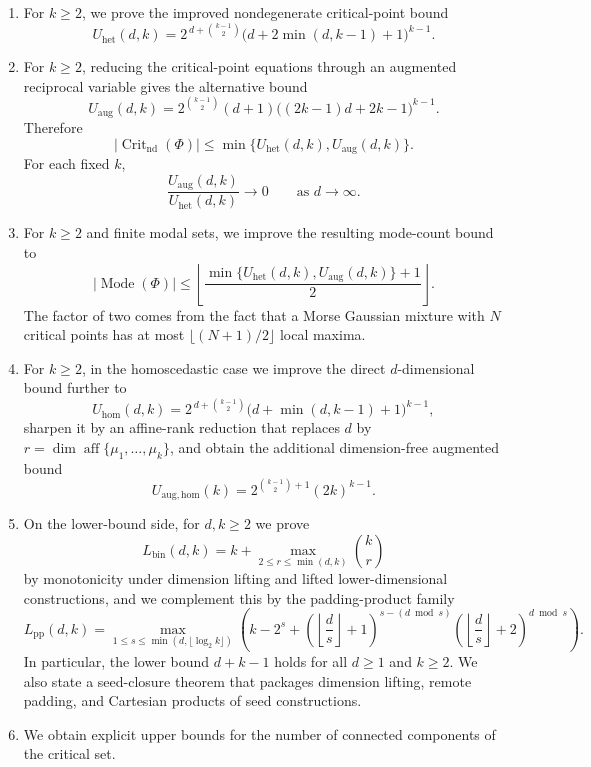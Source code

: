\documentclass[11pt]{article}
\theoremstyle{plain}
\theoremstyle{definition}
\theoremstyle{remark}
\numberwithin{equation}{section}
\DeclareMathOperator{\aff}{aff}
\DeclareMathOperator{\Crit}{Crit}
\DeclareMathOperator{\Mode}{Mode}
\begin{document}
\begin{enumerate}[1.]
    \item For $k\ge2$, we prove the improved nondegenerate critical-point bound
    \[
    U_{\mathrm{het}}(d,k)=2^{\,d+\binom{k-1}{2}}\bigl(d+2\min(d,k-1)+1\bigr)^{k-1}.
    \]
    \item For $k\ge2$, reducing the critical-point equations through an augmented reciprocal variable gives the alternative bound
    \[
    U_{\mathrm{aug}}(d,k)=2^{\binom{k-1}{2}}(d+1)\bigl((2k-1)d+2k-1\bigr)^{k-1}.
    \]
    Therefore
    \[
    |\Crit_{\mathrm{nd}}(\Phi)|\le \min\{U_{\mathrm{het}}(d,k),U_{\mathrm{aug}}(d,k)\}.
    \]
    For each fixed $k$,
    \[
    \frac{U_{\mathrm{aug}}(d,k)}{U_{\mathrm{het}}(d,k)}\to 0
    \qquad\text{as } d\to\infty.
    \]
    \item For $k\ge2$ and finite modal sets, we improve the resulting mode-count bound to
    \[
    |\Mode(\Phi)|\le
    \left\lfloor
    \frac{\min\{U_{\mathrm{het}}(d,k),U_{\mathrm{aug}}(d,k)\}+1}{2}
    \right\rfloor.
    \]
    The factor of two comes from the fact that a Morse Gaussian mixture with $N$ critical points has at most $\lfloor(N+1)/2\rfloor$ local maxima.
    \item For $k\ge2$, in the homoscedastic case we improve the direct $d$-dimensional bound further to
    \[
    U_{\mathrm{hom}}(d,k)=2^{\,d+\binom{k-1}{2}}\bigl(d+\min(d,k-1)+1\bigr)^{k-1},
    \]
    sharpen it by an affine-rank reduction that replaces $d$ by $r=\dim \aff\{\mu_1,\dots,\mu_k\}$, and obtain the additional dimension-free augmented bound
    \[
    U_{\mathrm{aug,hom}}(k)=2^{\binom{k-1}{2}+1}(2k)^{k-1}.
    \]
    \item On the lower-bound side, for $d,k\ge2$ we prove
    \[
    L_{\mathrm{bin}}(d,k)=k+\max_{2\le r\le \min(d,k)}\binom{k}{r}
    \]
    by monotonicity under dimension lifting and lifted lower-dimensional constructions, and we complement this by the padding-product family
    \[
    L_{\mathrm{pp}}(d,k)=\max_{1\le s\le \min(d,\lfloor \log_2 k\rfloor)}\left(k-2^s+\left(\left\lfloor\frac{d}{s}\right\rfloor+1\right)^{s-(d\bmod s)}\left(\left\lfloor\frac{d}{s}\right\rfloor+2\right)^{d\bmod s}\right).
    \]
    In particular, the lower bound $d+k-1$ holds for all $d\ge 1$ and $k\ge 2$. We also state a seed-closure theorem that packages dimension lifting, remote padding, and Cartesian products of seed constructions.
    \item We obtain explicit upper bounds for the number of connected components of the critical set.
\end{enumerate}
\end{document}
